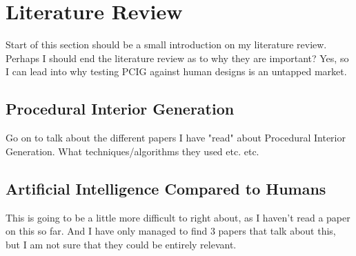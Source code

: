 \section{Literature Review}

Start of this section should be a small introduction on my literature review.
\\
Perhaps I should end the literature review as to why they are important?
Yes, so I can lead into why testing PCIG against human designs is an untapped market.

\subsection{Procedural Interior Generation}
Go on to talk about the different papers I have "read" about Procedural Interior Generation.
What techniques/algorithms they used etc. etc. \cite{real-time-walkthroughs}


\subsection{Artificial Intelligence Compared to Humans}
This is going to be a little more difficult to right about, as I haven't read a paper on this so far.
And I have only managed to find 3 papers that talk about this, but I am not sure that they could be entirely relevant.